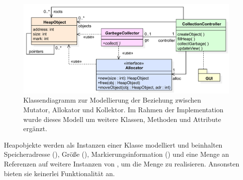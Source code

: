 \begin{figure}[h]
	\centering
	\includegraphics[scale=0.6]{img/uml/ch7-model.pdf}
	\caption[Klassendiagramm zur Modellierung von Mutator, Allokator und Kollektor]{Klassendiagramm zur Modellierung der Beziehung zwischen Mutator, Allokator und Kollektor. Im Rahmen der Implementation wurde dieses Modell um weitere Klassen, Methoden und Attribute ergänzt.}
	\label{fig:model}
\end{figure}


Heapobjekte werden als Instanzen einer Klasse  modelliert und beinhalten Speicheradresse (), Größe (), Markierungsinformation () und eine Menge  an Referenzen auf weitere Instanzen von , um die Menge \Pointers zu realisieren.
Ansonsten bieten sie keinerlei Funktionalität an.

